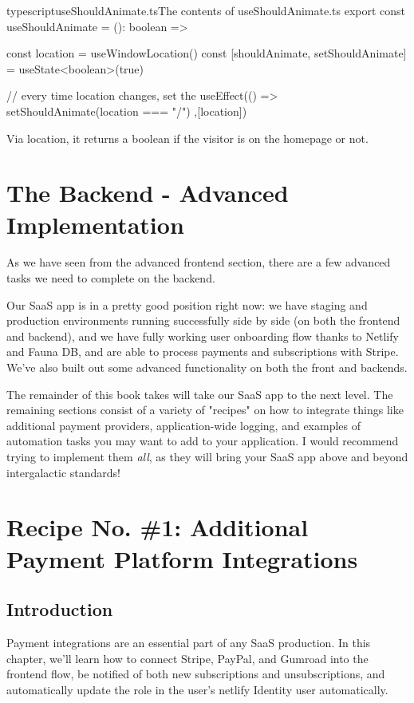 \documentclass[paper=6in:9in,pagesize=pdftex,headinclude=on,footinclude=on,12pt]{scrbook}
\begin{document}
\begin{codeInput}{typescript}{useShouldAnimate.ts}{The contents of useShouldAnimate.ts}
export const useShouldAnimate = (): boolean => {
  const location = useWindowLocation()
  const [shouldAnimate, setShouldAnimate] = useState<boolean>(true)

  // every time location changes, set the
  useEffect(() => {
    setShouldAnimate(location === "/") 
  },[location])
}
\end{codeInput}

Via location, it returns a boolean if the visitor is on the homepage or not.

\chapter{The Backend - Advanced Implementation}

As we have seen from the advanced frontend section, there are a few advanced tasks we need to complete on the backend.


Our SaaS app is in a pretty good position right now: we have staging and production environments running successfully side by side (on both the frontend and backend), and we have fully working user onboarding flow thanks to Netlify and Fauna DB, and are able to process payments and subscriptions with Stripe. We've also built out some advanced functionality on both the front and backends. 

The remainder of this book takes will take our SaaS app to the next level. The remaining sections consist of a variety of "recipes" on how to integrate things like additional payment providers, application-wide logging, and examples of automation tasks you may want to add to your application. I would recommend trying to implement them \textit{all}, as they will bring your SaaS app above and beyond intergalactic standards! \rocket

\chapter{Recipe No. \#1: Additional Payment Platform Integrations}

\section{Introduction}

Payment integrations are an essential part of any SaaS production. In this chapter, we'll learn how to connect Stripe, PayPal, and Gumroad into the frontend flow, be notified of both new subscriptions and unsubscriptions, and automatically update the role in the user's netlify Identity user automatically.
\end{document}
